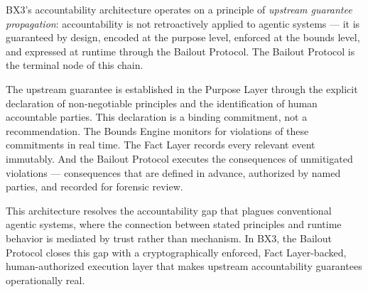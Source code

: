 BX3's accountability architecture operates on a principle of \textit{upstream guarantee propagation}: accountability is not retroactively applied to agentic systems — it is guaranteed by design, encoded at the purpose level, enforced at the bounds level, and expressed at runtime through the Bailout Protocol. The Bailout Protocol is the terminal node of this chain.

The upstream guarantee is established in the Purpose Layer through the explicit declaration of non-negotiable principles and the identification of human accountable parties. This declaration is a binding commitment, not a recommendation. The Bounds Engine monitors for violations of these commitments in real time. The Fact Layer records every relevant event immutably. And the Bailout Protocol executes the consequences of unmitigated violations — consequences that are defined in advance, authorized by named parties, and recorded for forensic review.

This architecture resolves the accountability gap that plagues conventional agentic systems, where the connection between stated principles and runtime behavior is mediated by trust rather than mechanism. In BX3, the Bailout Protocol closes this gap with a cryptographically enforced, Fact Layer-backed, human-authorized execution layer that makes upstream accountability guarantees operationally real.
